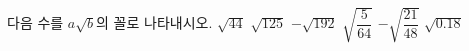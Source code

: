 다음 수를 $a\sqrt{b}$의 꼴로 나타내시오. 
 $\sqrt{44}$
 $\sqrt{125}$
 $-\sqrt{192}$
 $\sqrt{\dfrac{5}{64}}$
 $-\sqrt{\dfrac{21}{48}}$
 $\sqrt{0.18}$
